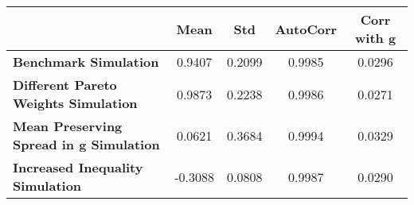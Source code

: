 \begin{tiny}\begin{tabular}{|l|c|c|c|c|}
\hline
&\textbf{Mean}&\textbf{Std}&\textbf{AutoCorr}&\textbf{Corr with g}\\\hline
\textbf{Benchmark Simulation}&0.9407&0.2099&0.9985&0.0296\\\hline
\textbf{Different Pareto Weights Simulation}&0.9873&0.2238&0.9986&0.0271\\\hline
\textbf{Mean Preserving Spread in g Simulation}&0.0621&0.3684&0.9994&0.0329\\\hline
\textbf{Increased Inequality Simulation}&-0.3088&0.0808&0.9987&0.0290\\\hline
\end{tabular}
\end{tiny}